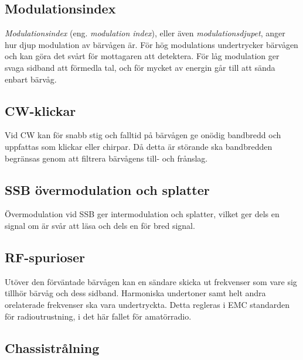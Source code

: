 \subsection{Modulationsindex}

\emph{Modulationsindex} (eng. \emph{modulation index}), eller även
\emph{modulationsdjupet}, anger hur djup modulation av bärvågen är.
För hög modulations undertrycker bärvågen och kan göra det svårt för
mottagaren att detektera.
För låg modulation ger svaga sidband att förmedla tal, och för mycket
av energin går till att sända enbart bärvåg.

\subsection{CW-klickar}
\label{cw-klickar}

Vid CW kan för snabb stig och falltid på bärvågen ge onödig bandbredd och
uppfattas som klickar eller chirpar.
Då detta är störande ska bandbredden begränsas genom att filtrera bärvågens
till- och frånslag.

\subsection{SSB övermodulation och splatter}
\label{splatter}

Övermodulation vid SSB ger intermodulation och splatter, vilket ger dels en
signal om är svår att läsa och dels en för bred signal.

\subsection{RF-spurioser}

Utöver den förväntade bärvågen kan en sändare skicka ut frekvenser som vare
sig tillhör bärvåg och dess sidband.
Harmoniska undertoner samt helt andra orelaterade frekvenser ska vara
undertryckta.
Detta regleras i EMC standarden för radioutrustning, i det här fallet för
amatörradio.

\subsection{Chassistrålning}

